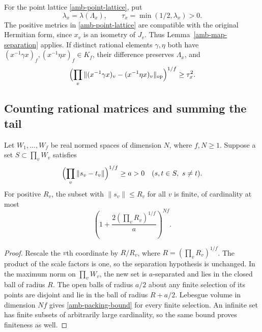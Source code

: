 For the point lattice \eqref{amb-point-lattice}, put
\begin{equation}\label{amb-tau}
          \lambda_x=\lambda(\Lambda_x),\qquad
          \tau_x=\min(1/2,\lambda_x)>0.
\end{equation}
The positive metrics in \eqref{amb-point-lattice} are compatible
with the original Hermitian form, since $x_v$ is an isometry of
$J_v$. Thus Lemma~\ref{amb-map-separation} applies. If distinct
rational elements $\gamma,\eta$ both have
$(x^{-1}\gamma x)_f,(x^{-1}\eta x)_f\in K_f$, their difference
preserves $\Lambda_x$, and
\begin{equation}\label{amb-two-matrices}
 \Bigl(\prod_v\|(x^{-1}\gamma x)_v
                         -(x^{-1}\eta x)_v\|_{\rm op}\Bigr)^{1/f}
                                                    \ge\tau_x^2.
\end{equation}

\subsection{Counting rational matrices and summing the tail}

\begin{lemma}\label{amb-packing}
Let $W_1,\ldots,W_f$ be real normed spaces of dimension $N$,
where $f,N\ge1$. Suppose a set $S\subset\prod_vW_v$ satisfies
\[
       \Bigl(\prod_v\|s_v-t_v\|\Bigr)^{1/f}\ge a>0
                       \quad(s,t\in S,\ s\ne t).
\]
For positive $R_v$, the subset with $\|s_v\|\le R_v$ for all
$v$ is finite, of cardinality at most
\begin{equation}\label{amb-packing-bound}
              \left(1+\frac{2(\prod_vR_v)^{1/f}}a\right)^{Nf}.
\end{equation}
\end{lemma}
\begin{proof}
Rescale the $v$th coordinate by $R/R_v$, where
$R=(\prod_vR_v)^{1/f}$. The product of the scale factors is one,
so the separation hypothesis is unchanged. In the maximum norm
on $\prod_vW_v$, the new set is $a$-separated and lies in the
closed ball of radius $R$. The open balls of radius $a/2$ about
any finite selection of its points are disjoint and lie in the
ball of radius $R+a/2$. Lebesgue volume in dimension $Nf$ gives
\eqref{amb-packing-bound} for every finite selection. An infinite
set has finite subsets of arbitrarily large cardinality, so the
same bound proves finiteness as well.
\end{proof}

